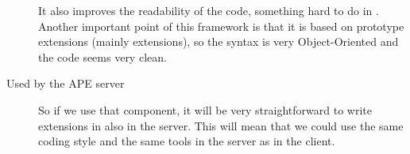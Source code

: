 \begin{description}
  It also improves the readability of the code, something hard to do in .
  Another important point of this framework is that it is based on prototype extensions (mainly  extensions), so the syntax is very Object-Oriented and the code seems very clean.

  \item[Used by the \ac{APE} server\index{APE server}]
  So if we use that component, it will be very straightforward to write extensions in  also in the server.
  This will mean that we could use the same coding style and the same tools in the server as in the client.

\end{description}


